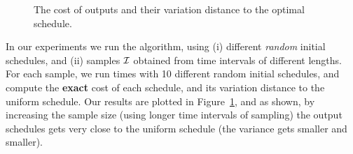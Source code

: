 \begin{figure}[htbp]
	\caption{\scriptsize The cost of \algonameapx outputs and their variation distance to the optimal schedule.} \label{fig:unique}
\end{figure}
In our experiments we run the \algonameapx algorithm, using (i) different \emph{random} initial schedules, and (ii) samples $\mathcal{I}$ obtained from time intervals of different lengths. For each sample, we run  times with 10 different random initial schedules, and compute the \textbf{exact} cost of each schedule, and its variation distance to the uniform schedule. Our results are plotted in Figure~\ref{fig:unique}, and as shown, by increasing the sample size (using longer time intervals of sampling) the output schedules gets very close to the uniform schedule (the variance gets smaller and smaller).

